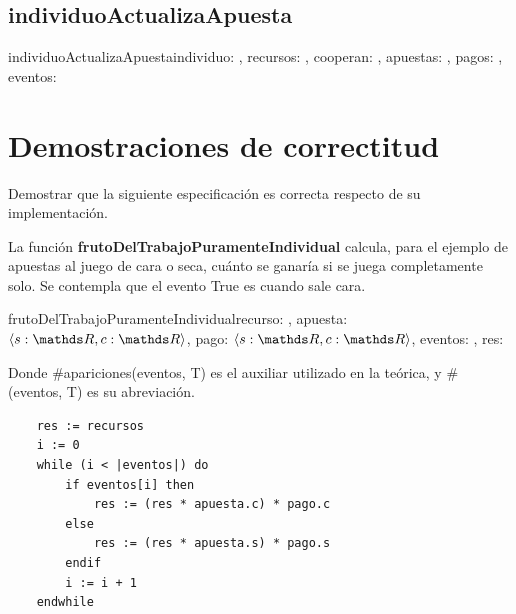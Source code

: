 \documentclass[10pt,a4paper]{article}
\begin{document}
\subsection{individuoActualizaApuesta}
\begin{proc}{individuoActualizaApuesta}{\In individuo: \nat, \In recursos: \TLista{\float}, \In cooperan: \TLista{\bool}, \Inout apuestas: \TLista{\TLista{\bool}}, \In pagos: \TLista{\TLista{\float}}, \In eventos: \TLista{\TLista{\nat}}} {}
	\requiere {-}
	\asegura{-}
\end{proc}







\section{Demostraciones de correctitud}

Demostrar que la siguiente especificación es correcta respecto de su implementación.

La función \textbf{frutoDelTrabajoPuramenteIndividual} calcula, para el ejemplo de apuestas al juego de cara o seca, cuánto se ganaría si se juega completamente solo. Se contempla que el evento True es cuando sale cara.

\begin{proc}{frutoDelTrabajoPuramenteIndividual}{\In recurso: \float, \In apuesta: \ensuremath{\langle s: \float, c: \float \rangle}, \In pago: \ensuremath{\langle s: \float, c: \float \rangle}, \In eventos: \TLista {\bool}, \Out res: \float } {}
\end{proc}

Donde \#apariciones(eventos, T) es el auxiliar utilizado en la teórica, y \#(eventos, T) es su abreviación.
\begin{lstlisting}
	res := recursos
	i := 0
	while (i < |eventos|) do
		if eventos[i] then
			res := (res * apuesta.c) * pago.c
		else
			res := (res * apuesta.s) * pago.s
		endif
		i := i + 1
	endwhile
	\end{lstlisting}
\end{document}
